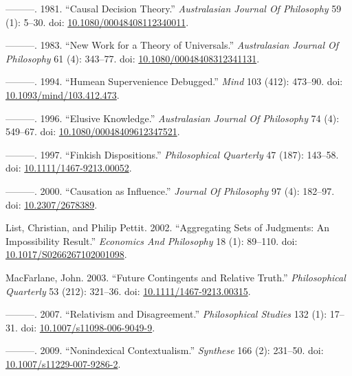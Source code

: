 \documentclass[
  10pt,
  letterpaper,
  DIV=11,
  numbers=noendperiod,
  twoside]{scrartcl}
\newlength{\cslhangindent}
\newenvironment{CSLReferences}[2] %
 {\begin{list}{}{%
  \setlength{\itemindent}{0pt}
  \setlength{\leftmargin}{0pt}
  \setlength{\parsep}{0pt}
  \ifodd #1
   \setlength{\leftmargin}{\cslhangindent}
   \setlength{\itemindent}{-1\cslhangindent}
  \fi
  \setlength{\itemsep}{#2\baselineskip}}}
 {\end{list}}
\begin{document}
\begin{CSLReferences}{1}{0}
---------. 1981. {``Causal Decision Theory.''} \emph{Australasian
Journal Of Philosophy} 59 (1): 5--30. doi:
\href{https://doi.org/10.1080/00048408112340011}{10.1080/00048408112340011}.

---------. 1983. {``New Work for a Theory of Universals.''}
\emph{Australasian Journal Of Philosophy} 61 (4): 343--77. doi:
\href{https://doi.org/10.1080/00048408312341131}{10.1080/00048408312341131}.

---------. 1994. {``Humean Supervenience Debugged.''} \emph{Mind} 103
(412): 473--90. doi:
\href{https://doi.org/10.1093/mind/103.412.473}{10.1093/mind/103.412.473}.

---------. 1996. {``Elusive Knowledge.''} \emph{Australasian Journal Of
Philosophy} 74 (4): 549--67. doi:
\href{https://doi.org/10.1080/00048409612347521}{10.1080/00048409612347521}.

---------. 1997. {``Finkish Dispositions.''} \emph{Philosophical
Quarterly} 47 (187): 143--58. doi:
\href{https://doi.org/10.1111/1467-9213.00052}{10.1111/1467-9213.00052}.

---------. 2000. {``Causation as Influence.''} \emph{Journal Of
Philosophy} 97 (4): 182--97. doi:
\href{https://doi.org/10.2307/2678389}{10.2307/2678389}.

List, Christian, and Philip Pettit. 2002. {``Aggregating Sets of
Judgments: An Impossibility Result.''} \emph{Economics And Philosophy}
18 (1): 89--110. doi:
\href{https://doi.org/10.1017/S0266267102001098}{10.1017/S0266267102001098}.

MacFarlane, John. 2003. {``Future Contingents and Relative Truth.''}
\emph{Philosophical Quarterly} 53 (212): 321--36. doi:
\href{https://doi.org/10.1111/1467-9213.00315}{10.1111/1467-9213.00315}.

---------. 2007. {``Relativism and Disagreement.''} \emph{Philosophical
Studies} 132 (1): 17--31. doi:
\href{https://doi.org/10.1007/s11098-006-9049-9}{10.1007/s11098-006-9049-9}.

---------. 2009. {``Nonindexical Contextualism.''} \emph{Synthese} 166
(2): 231--50. doi:
\href{https://doi.org/10.1007/s11229-007-9286-2}{10.1007/s11229-007-9286-2}.


\end{CSLReferences}
\end{document}
